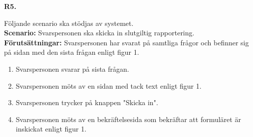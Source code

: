 \documentclass{article}
\begin{document}
   \vspace{1em}
\noindent \large{\textbf{R5.}}
    \normalsize{Följande scenario ska stödjas av systemet.
        \\
       \textbf{Scenario:} Svarspersonen ska skicka in slutgiltig rapportering.
        \\
        \textbf{Förutsättningar:} Svarspersonen har svarat på samtliga frågor och befinner sig på sidan med den sista frågan enligt figur 1.
            \begin{enumerate}
                \item Svarspersonen svarar på sista frågan.
                \item Svarspersonen möts av en sidan med tack text enligt figur 1.
                \item Svarspersonen trycker på knappen "Skicka in".
                \item  Svarspersonen möts av en bekräftelsesida som bekräftar att formuläret är inskickat enligt figur 1.
            \end{enumerate}
}
\end{document}
